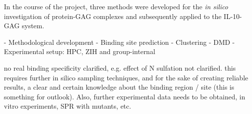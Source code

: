 In the course of the
project, three methods were developed for the \textit{in silico} investigation
of protein-GAG complexes and subsequently applied to the IL-10-GAG system.


    - Methodological development
        - Binding site prediction
        - Clustering
        - DMD
        - Experimental setup: HPC, ZIH and group-internal


    no real binding specificity clarified, e.g. effect of N sulfation not clarified. this requires further in silico sampling techniques, and for the sake of creating reliable results, a clear and certain knowledge about the binding region / site (this is something for outlook). Also, further experimental data needs to be obtained, in vitro experiments, SPR with mutants, etc.


